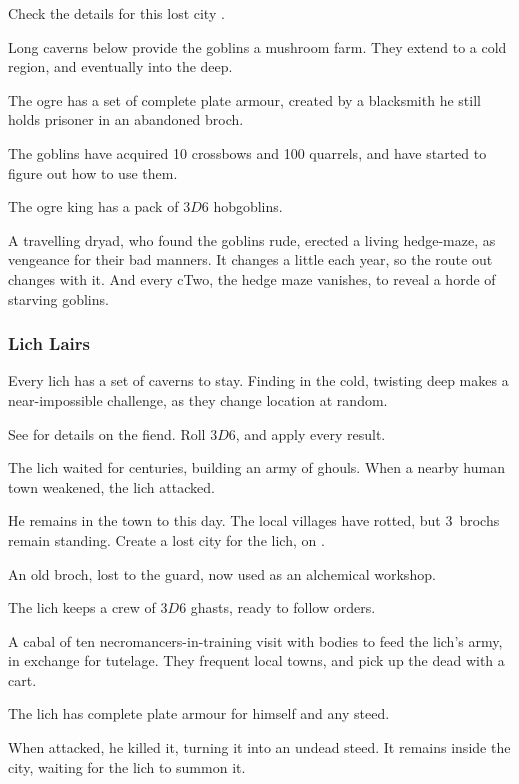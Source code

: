 \begin{multicols}{2}
\begin{dlist}
  Check the details for this lost city .
  \item
  Long caverns below provide the goblins a mushroom farm.
  They extend to a cold region, and eventually into the \gls{deep}.
  \item
  The \gls{ogre} has a set of complete plate armour, created by a blacksmith he still holds prisoner in an abandoned \gls{broch}.
  \item
  The goblins have acquired 10 crossbows and 100 quarrels, and have started to figure out how to use them.
  \item
  The \gls{ogre} king has a pack of $3D6$ hobgoblins.
  \item
  A travelling dryad, who found the goblins rude, erected a living hedge-maze, as vengeance for their bad manners.
  It changes a little each year, so the route out changes with it.
  And every \gls{cTwo}, the hedge maze vanishes, to reveal a horde of starving goblins.
\end{dlist}

\subsubsection{Lich Lairs}
\label{lichPoint}

Every \gls{lich} has a set of caverns to stay.
Finding  in the cold, twisting \gls{deep} makes a near-impossible challenge, as they change location at random.

See  for details on the fiend.
Roll $3D6$, and apply every result.

\begin{dlist}
  \item
  The \gls{lich} waited for centuries, building an army of ghouls.
  When a nearby human town weakened, the \gls{lich} attacked.

  He remains in the town to this day.
  The local \glspl{village} have rotted, but 3~\glspl{broch} remain standing.
  Create a lost city for the \gls{lich}, on .
  \item
  An old \gls{broch}, lost to the \gls{guard}, now used as an alchemical workshop.
  \item
  The \gls{lich} keeps a crew of $3D6$ ghasts, ready to follow orders.
  \item
  A cabal of ten necromancers-in-training visit with bodies to feed the \gls{lich}'s army, in exchange for tutelage.
  They frequent local towns, and pick up the dead with a cart.
  \item
  The \gls{lich} has complete plate armour for himself and any steed.
  \item
  When  attacked, he killed it, turning it into an undead steed.
  It remains inside the city, waiting for the \gls{lich} to summon it.
\end{dlist}

\end{multicols}

